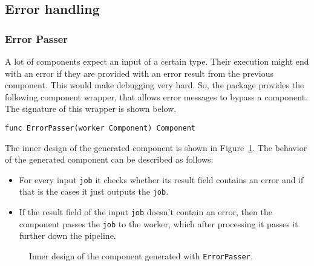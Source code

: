 \subsection{Error handling}

\subsubsection{Error Passer}
A lot of components expect an input of a certain type. Their execution
might end with an error if they are provided with an error result from
the previous component. This would make debugging very hard. So, the 
package provides the following component wrapper, that allows error messages
to bypass a component. The signature of this wrapper is shown below.
\begin{lstlisting}
func ErrorPasser(worker Component) Component
\end{lstlisting}
The inner design of the generated component is shown in 
Figure~\ref{fig:errPasserDiag}. The behavior of the generated component 
can be described as follows:
\begin{itemize}
	\item For every input \texttt{job} it checks whether its result field 
          contains an error and if that is the cases it just outputs the 
          \texttt{job}.
	\item If the result field of the input \texttt{job} doesn't contain 
          an error, then the component passes the \texttt{job} to the worker, 
          which after processing it passes it further down the pipeline.
\end{itemize}

\begin{figure}[h]
\centering
{}
\caption[scale=1.0]{Inner design of the component generated with
  \texttt{ErrorPasser}.}
\label{fig:errPasserDiag}
\end{figure}

